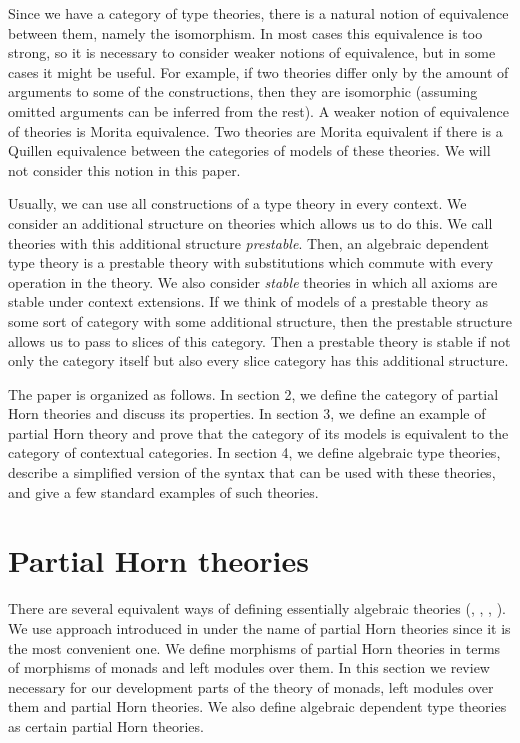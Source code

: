 \documentclass[reqno]{amsart}
\theoremstyle{definition}
\theoremstyle{remark}
\numberwithin{figure}{section}
\begin{document}
Since we have a category of type theories, there is a natural notion of equivalence between them, namely the isomorphism.
In most cases this equivalence is too strong, so it is necessary to consider weaker notions of equivalence, but in some cases it might be useful.
For example, if two theories differ only by the amount of arguments to some of the constructions,
then they are isomorphic (assuming omitted arguments can be inferred from the rest).
A weaker notion of equivalence of theories is Morita equivalence.
Two theories are Morita equivalent if there is a Quillen equivalence between the categories of models of these theories.
We will not consider this notion in this paper.

Usually, we can use all constructions of a type theory in every context.
We consider an additional structure on theories which allows us to do this.
We call theories with this additional structure \emph{prestable}.
Then, an algebraic dependent type theory is a prestable theory with substitutions which commute with every operation in the theory.
We also consider \emph{stable} theories in which all axioms are stable under context extensions.
If we think of models of a prestable theory as some sort of category with some additional structure,
then the prestable structure allows us to pass to slices of this category.
Then a prestable theory is stable if not only the category itself but also every slice category has this additional structure.

The paper is organized as follows.
In section 2, we define the category of partial Horn theories and discuss its properties.
In section 3, we define an example of partial Horn theory and prove that the category of its models is equivalent to the category of contextual categories.
In section 4, we define algebraic type theories, describe a simplified version of the syntax that can be used with these theories, and give a few standard examples of such theories.

\section{Partial Horn theories}
\label{sec:PHT}

There are several equivalent ways of defining essentially algebraic theories (\cite{LPC}, \cite{GAT}, \cite{PHL}, \cite[D 1.3.4]{elephant}).
We use approach introduced in \cite{PHL} under the name of partial Horn theories since it is the most convenient one.
We define morphisms of partial Horn theories in terms of morphisms of monads and left modules over them.
In this section we review necessary for our development parts of the theory of monads, left modules over them and partial Horn theories.
We also define algebraic dependent type theories as certain partial Horn theories.
\end{document}
